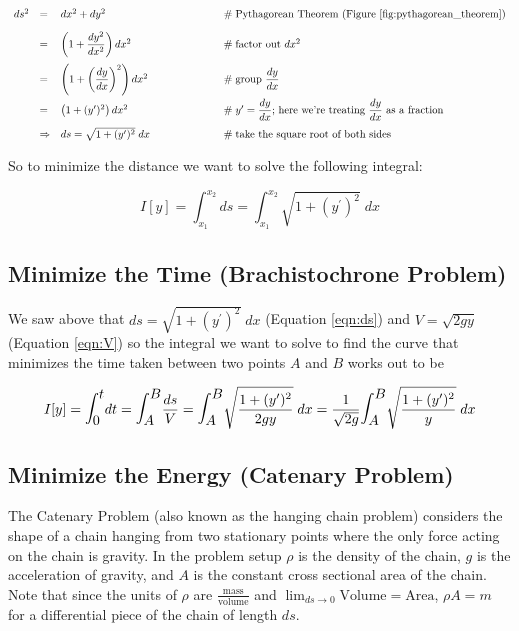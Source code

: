 \documentclass{article}
\theoremstyle{definition}
\begin{document}
\begin{equation*}
\begin{array}{lllll}
ds^2
&=& dx^2 + dy^2   												&\qquad \qquad \qquad \mathrel{\#} \text{Pythagorean Theorem (Figure \ref{fig:pythagorean_theorem})} \\
[10pt]
&=& \left ( 1 + \dfrac{dy^2}{dx^2} \right ) dx^2				&\qquad \qquad \qquad \mathrel{\#} \text{factor out $dx^2$} \\
[12pt]
&=& \left ( 1 + \left (\dfrac{dy}{dx} \right )^2 \right ) dx^2	&\qquad \qquad \qquad \mathrel{\#} \text{group $\dfrac{dy}{dx}$} \\
[12pt]
&=& \left ( 1 + (y^{\prime})^2 \right ) dx^2					&\qquad \qquad \qquad \mathrel{\#} \text{$y^{\prime} = \dfrac{dy}{dx}$; here we're treating $\dfrac{dy}{dx}$ as a fraction}\\
[10pt]
&\Rightarrow& ds = \sqrt{1 + (y^{\prime})^2} \; dx				&\qquad \qquad \qquad \mathrel{\#} \text{take the square root of both sides}
\end{array}
\end{equation*}


\bigskip
\noindent
So to minimize the distance we want to solve the following integral: 

\bigskip
\begin{equation*}
I[y] = \int_{x_1}^{x_2} ds = \int_{x_1}^{x_2} \sqrt{1 + (y^{\prime})^2} \; dx
\end{equation*}	

\medskip
\subsection{Minimize the Time (Brachistochrone Problem)}
We saw above that $ds = \sqrt{1 + (y^{\prime})^2} \; dx$	
(Equation \ref{eqn:ds}) and $V = \sqrt{2gy}$ (Equation 
\ref{eqn:V}) so the integral we want to solve to find the 
curve that minimizes the time taken between two points $A$ 
and $B$ works out to be 

\bigskip
\begin{equation*}
I[y]
= \mathlarger{\mathlarger{\int_0^t}} dt = \mathlarger{\mathlarger{\int_A^B}} \dfrac{ds}{V} 
= \mathlarger{\mathlarger{\int_A^B}} \sqrt{\dfrac{1 + (y^{\prime})^2}{2gy}} \; dx
= \dfrac{1}{\sqrt{2g}} \mathlarger{\mathlarger{\int_A^B}} \sqrt{\dfrac{1 + (y^{\prime})^2}{y}} \; dx
\end{equation*}

\medskip
\subsection{Minimize the Energy (Catenary Problem)}
The Catenary Problem \cite{wiki:catenary} (also known as
the hanging chain problem) considers the shape of a 
chain hanging from two stationary points where the only force
acting on the chain is gravity. In the problem setup $\rho$ 
is the density of the chain, $g$ is the acceleration of gravity, 
and $A$ is the constant cross sectional area of the chain. 
Note that since the units of 
$\rho$ are $\frac{\text{mass}}{\text{volume}}$ and  
${\displaystyle \lim_{ds \to 0} \text{Volume} = \text{Area}}$,
$\rho A = m$  for a differential piece of the chain of 
length $ds$.
\end{document}
